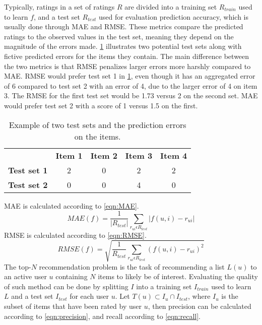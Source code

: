Typically, ratings in a set of ratings $R$ are divided into a training set $R_{train}$ used to learn $f$, and a test set $R_{test}$ used for evaluation prediction accuracy, which is usually done through MAE and RMSE.
These metrics compare the predicted ratings to the observed values in the test set, meaning they depend on the magnitude of the errors made.
\cref{tab:rmsevsmae} illustrates two potential test sets along with fictive predicted errors for the items they contain.
The main difference between the two metrics is that RMSE penalizes larger errors more harshly compared to MAE.
RMSE would prefer test set 1 in \cref{tab:rmsevsmae}, even though it has an aggregated error of 6 compared to test set 2 with an error of 4, due to the larger error of 4 on item 3.
The RMSE for the first test set would be 1.73 versus 2 on the second set.
MAE would prefer test set 2 with a score of 1 versus 1.5 on the first.
\begin{table}[]\centering
    \caption{Example of two test sets and the prediction errors on the items.}\label{tab:rmsevsmae}
    \scriptsize
    \begin{tabular}{ccccc}\toprule
        &\textbf{Item 1} & \textbf{Item 2} & \textbf{Item 3} & \textbf{Item 4}\\\cmidrule{1-5}
        \textbf{Test set 1} & 2 & 0 & 2 & 2 \\\cmidrule{1-5}
        \textbf{Test set 2} & 0 & 0 & 4 & 0  \\\cmidrule{1-5}
    \bottomrule
    \end{tabular}
\end{table}
MAE is calculated according to \cref{eqn:MAE}.
\begin{equation}
    \label{eqn:MAE}
    MAE(f) = \frac{1}{|R_{test}|} \sum\limits_{r_{ui} \epsilon R_{test}} |f(u,i)-r_{ui}|
\end{equation}
RMSE is calculated according to \cref{eqn:RMSE}.
\begin{equation}
    \label{eqn:RMSE}
    RMSE(f) = \sqrt{\frac{1}{R_{test}} \sum\limits_{r_{ui} \epsilon R_{test}} (f(u, i) - r_{ui})^2}
\end{equation}
The top-$N$ recommendation problem is the task of recommending a list $L(u)$ to an active user $u$ containing $N$ items to likely be of interest.
Evaluating the quality of such method can be done by splitting $I$ into a training set $I_{train}$ used to learn $L$ and a test set $I_{test}$ for each user $u$.
Let $T(u) \subset I_u \cap I_{test}$, where $I_u$ is the subset of items that have been rated by user $u$, then precision can be calculated according to \cref{eqn:precision}, and recall according to \cref{eqn:recall}.
